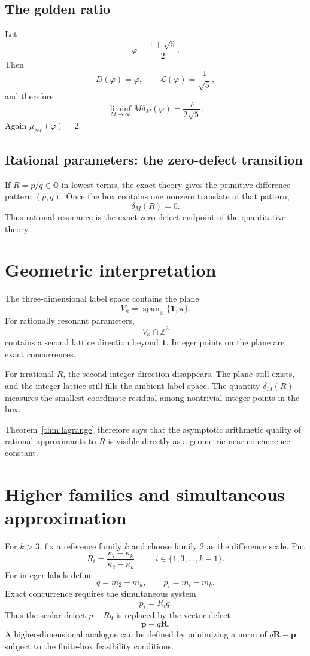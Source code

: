 \documentclass[11pt,a4paper]{article}
\newcommand{\deltam}{\delta_M}
\begin{document}
\subsection{The golden ratio}
Let
\[
\varphi=\frac{1+\sqrt5}{2}.
\]
Then
\[
D(\varphi)=\varphi,
\qquad
\mathcal L(\varphi)=\frac1{\sqrt5},
\]
and therefore
\[
\boxed{\liminf_{M\to\infty}M\deltam(\varphi)=\frac{\varphi}{2\sqrt5}.}
\]
Again $\mu_{\mathrm{geo}}(\varphi)=2$.

\subsection{Rational parameters: the zero-defect transition}
If $R=p/q\in\mathbb Q$ in lowest terms, the exact theory gives the primitive difference pattern
$(p,q)$. Once the box contains one nonzero translate of that pattern,
\[
\delta_M(R)=0.
\]
Thus rational resonance is the exact zero-defect endpoint of the quantitative theory.

\section{Geometric interpretation}
The three-dimensional label space contains the plane
\[
V_\kappa=\operatorname{span}_{\mathbb R}\{\mathbf1,\boldsymbol\kappa\}.
\]
For rationally resonant parameters,
\[
V_\kappa\cap\mathbb Z^3
\]
contains a second lattice direction beyond $\mathbf1$. Integer points on the plane are exact
concurrences.

For irrational $R$, the second integer direction disappears. The plane still exists, and the
integer lattice still fills the ambient label space. The quantity $\delta_M(R)$ measures the
smallest coordinate residual among nontrivial integer points in the box.

Theorem~\ref{thm:lagrange} therefore says that the asymptotic arithmetic quality of rational
approximants to $R$ is visible directly as a geometric near-concurrence constant.

\section{Higher families and simultaneous approximation}
For $k>3$, fix a reference family $k$ and choose family $2$ as the difference scale. Put
\[
R_i=\frac{\kappa_i-\kappa_k}{\kappa_2-\kappa_k},
\qquad i\in\{1,3,\ldots,k-1\}.
\]
For integer labels define
\[
q=m_2-m_k,
\qquad
p_i=m_i-m_k.
\]
Exact concurrence requires the simultaneous system
\[
p_i=R_iq.
\]
Thus the scalar defect $p-Rq$ is replaced by the vector defect
\[
\mathbf p-q\mathbf R.
\]
A higher-dimensional analogue can be defined by minimizing a norm of $q\mathbf R-\mathbf p$ subject to the finite-box feasibility conditions.
\end{document}
